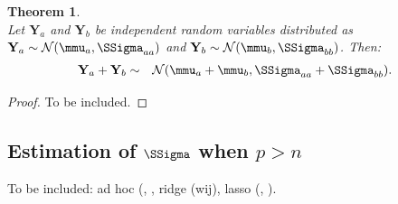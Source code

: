\documentclass[a4paper]{article}
\theoremstyle{myexamplestyle}
\newtheorem{ther}{Theorem}
\begin{document}
\begin{ther} \mbox{ }
\\
Let $\mathbf{Y}_a$  and $\mathbf{Y}_b$ be independent random variables distributed as $\mathbf{Y}_a \sim \mathcal{N}(\mmu_a, \SSigma_{aa})$ and $\mathbf{Y}_b \sim \mathcal{N}(\mmu_b, \SSigma_{bb})$. Then:
\begin{eqnarray*}
\mathbf{Y}_a + \mathbf{Y}_b & \sim & \mathcal{N}(\mmu_a + \mmu_b, \SSigma_{aa} + \SSigma_{bb}).
\end{eqnarray*}
\end{ther}
\begin{proof} 
To be included. 
\end{proof}



\subsection{Estimation of $\SSigma$ when $p > n$}
To be included: ad hoc (\citealp{Sch2005}, \cite{Ledo2004}, ridge (wij), lasso (\citealp{Bane2008}, \citealp{Frie2007}).


\newpage
\end{document}
